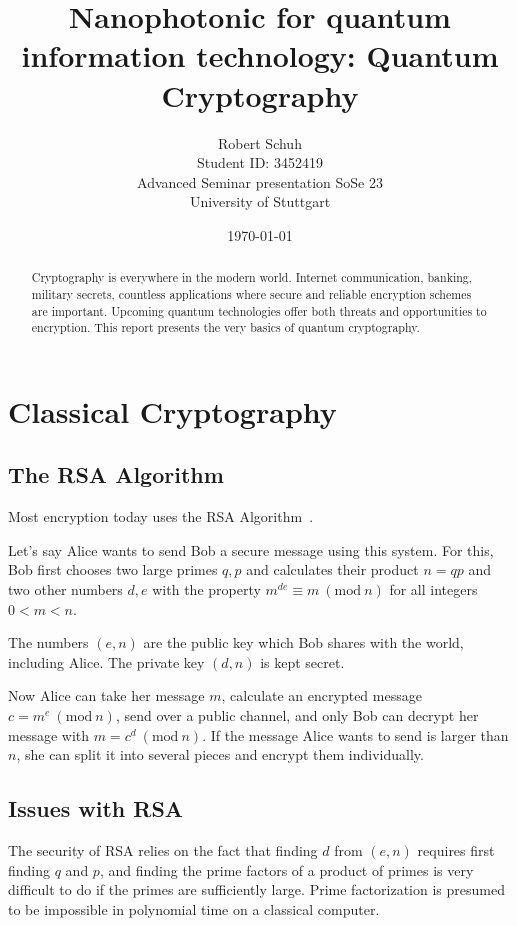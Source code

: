 \documentclass[12pt]{article}
\title{Nanophotonic for quantum information technology: Quantum Cryptography}
\author{Robert Schuh\\
\AND
Student ID: 3452419\\
\AND
\AND
\AND
\AND
	Advanced Seminar presentation SoSe 23\\
\AND
	University of Stuttgart\\
}
\date{\today}
\newcommand{\Mod}[1]{\ (\mathrm{mod}\ #1)}
\begin{document}
\maketitle

\newpage
\tableofcontents
\thispagestyle{empty}

\newpage
\thispagestyle{empty}
\begin{abstract}
	Cryptography is everywhere in the modern world.
	Internet communication, banking, military secrets, countless applications where secure and reliable encryption schemes are important.
	Upcoming quantum technologies offer both threats and opportunities to encryption.
	This report presents the very basics of quantum cryptography.
\end{abstract}




\newpage
\setcounter{page}{1}



\section{Classical Cryptography}

\subsection{The RSA Algorithm}
\label{sec:rsa}
Most encryption today uses the RSA Algorithm~\citep{rsa}.

Let's say Alice wants to send Bob a secure message using this system.
For this, Bob first chooses two large primes $q, p$ and
calculates their product $n=qp$ and two other numbers $d, e$ with the property $m^{de} \equiv m \Mod n$ for all integers $0<m<n$.

The numbers $(e, n)$ are the public key which Bob shares with the world, including Alice.
The private key $(d, n)$ is kept secret.

Now Alice can take her message $m$, calculate an encrypted message $c = m^e \Mod n$, send over a public channel,
and only Bob can decrypt her message with $m = c^d \Mod n$.
If the message Alice wants to send is larger than $n$, she can split it into several pieces and encrypt them individually.

\subsection{Issues with RSA}
The security of RSA relies on the fact that finding $d$ from $(e, n)$ requires first finding $q$ and $p$,
and finding the prime factors of a product of primes is very difficult to do if the primes are sufficiently large.
Prime factorization is presumed to be impossible in polynomial time on a classical computer.
\end{document}
